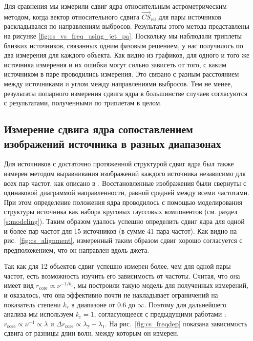Для сравнения мы измерили сдвиг ядра относительным астрометрическим методом, когда вектор
относительного сдвига $\vec{CS}_{\mathrm{rel}}$ для пары источников раскладывался по направлениям
выбросов. Результаты этого
метода представлены на рисунке \ref{fig:cs_vs_freq_using_jet_pa}. Поскольку мы наблюдали триплеты
близких источников, связанных одним фазовым решением, у нас получилось по два измерения для каждого
объекта. Как видно из графиков, для одного и того же источника измерения и их ошибки могут сильно
зависеть от того, с каким источником в паре проводились измерения. Это связано с разным расстоянием
между источниками и углом между направлениями выбросов. Тем не менее, результаты попарного
измерения сдвига ядра в большинстве случаев согласуются с результатами, полученными по триплетам в
целом.

\subsection{Измерение сдвига ядра сопоставлением изображений источника в разных диапазонах}
\label{s:method_image}
Для источников с достаточно протяженной структурой сдвиг ядра был также измерен методом
выравнивания изображений каждого источника независимо для всех пар частот, как описано в
\cite{Plavin2018}. Восстановленные изображения были свернуты с одинаковой диаграммой направленности,
равной средней между всеми частотами. При этом определение положения ядра проводилось с помощью
моделирования структуры источника как набора круговых гауссовых компонентов (см. раздел
\ref{s:modeling}). Таким образом удалось успешно определить сдвиг ядра для одной и более пар частот
для 15 источников (в сумме 41 пара частот). Как видно на рис.~\ref{fig:cs_alignment}, измеренный
таким образом сдвиг хорошо согласуется с предположением, что он направлен вдоль джета.

Так как для 12 объектов сдвиг успешно измерен более, чем для одной пары частот, есть возможность
изучить его зависимость от частоты. Считая, что она имеет вид $r_\text{core} \propto
\nu^{-1/k_\text{r}}$, мы построили такую модель для полученных измерений, и оказалось, что она
эффективно почти не накладывает ограничений на показатель степени $k_r$ в диапазоне от $0.6$ до
$\infty$. Поэтому для дальнейшего анализа мы используем $k_\text{r} = 1$, согласующееся с
предыдущими работами \cite{Sokolovsky_2011}: $r_\text{core} \propto \nu^{-1} \propto \lambda$ и
$\Delta r_\text{core} \propto \lambda_2 - \lambda_1$. На рис.~\ref{fig:cs_freqdep} показана
зависимость сдвига от разницы длин волн, между которым он измерен.

